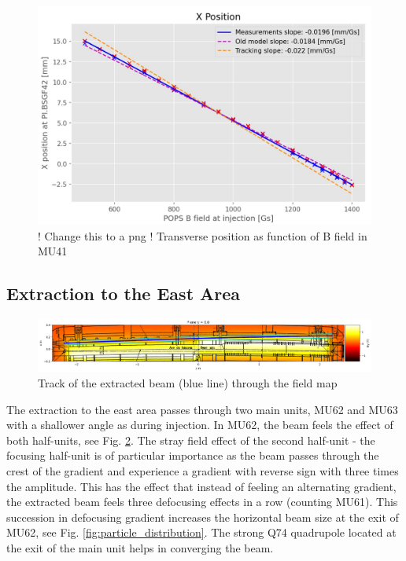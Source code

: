 \documentclass[a4paper,
               biblatex,     %
               keeplastbox,   %
               ]{jacow}
\begin{document}
\begin{figure}[!htb]
   \centering
   \includegraphics*[width=1.0\columnwidth]{injection_btp_transverse_position.jpg}
   \caption{! Change this to a png ! Transverse position as function of B field in MU41}
   \label{fig:injection_btp_transverse_position}
\end{figure}

\subsection{Extraction to the East Area}
\begin{figure}[!htb]
   \centering
   \includegraphics*[width=\textwidth]{track_mu62.png}
   \caption{Track of the extracted beam (blue line) through the field map}
   \label{fig:track mu62}
\end{figure}
The extraction to the east area passes through two main units, MU62 and MU63 with a shallower angle as during injection. In MU62, the beam feels the effect of both half-units, see Fig. \ref{fig:track mu62}. The stray field effect of the second half-unit - the focusing half-unit is of particular importance as the beam passes through the crest of the gradient and experience a gradient with reverse sign with three times the amplitude. This has the effect that instead of feeling an alternating gradient, the extracted beam feels three defocusing effects in a row (counting MU61). This succession in defocusing gradient increases the horizontal beam size at the exit of MU62, see Fig. \ref{fig:particle_distribution}. The strong Q74 quadrupole located at the exit of the main unit helps in converging the beam.
\end{document}
